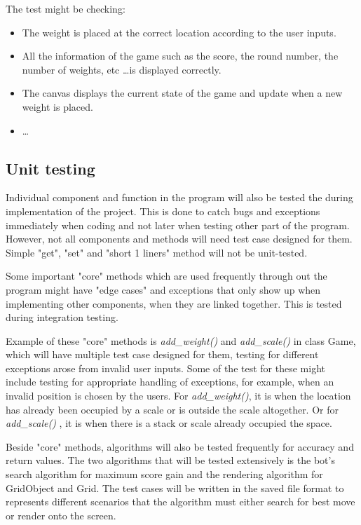 \documentclass[12pt]{article}
\begin{document}
The test might be checking:
\begin{itemize}
  \item The weight is placed at the correct location according to the user
    inputs.
  \item All the information of the game such as the score, the round number, the
    number of weights, etc \dots is displayed correctly.
  \item The canvas displays the current state of the game and update
    when a new weight is placed.
  \item \dots
\end{itemize}

\subsection{Unit testing}

Individual component and function in the program will also be tested the during
implementation of the project. This is done to catch bugs and exceptions
immediately when coding and not later when testing other part of the program.
However, not all components and methods will need test case designed for them.
Simple "get", "set" and "short 1 liners" method will not be unit-tested. 

Some important "core" methods which are used frequently through out the program
might have "edge cases" and exceptions that only show up when implementing other
components, when they are linked together. This is tested during integration
testing.

Example of these "core" methods is \textit{add\_weight()} and
\textit{add\_scale()} in class Game, which will have multiple test case designed
for them, testing for different exceptions arose from invalid user inputs. Some
of the test for these might include testing for appropriate handling of
exceptions, for example, when an invalid position is chosen by the users.  For
\textit{add\_weight()}, it is when the location has already been occupied by a
scale or is outside the scale altogether. Or for \textit{add\_scale()} , it is
when there is a stack or scale already occupied the space.

Beside "core" methods, algorithms will also be tested frequently for accuracy
and return values. The two algorithms that will be tested extensively is the
bot's search algorithm for maximum score gain and the rendering algorithm for
GridObject and Grid. The test cases will be written in the saved file format to
represents different scenarios that the algorithm must either search for best
move or render onto the screen.

\nocite{nystrom2014game}
\nocite{scalacollection}


\end{document}
